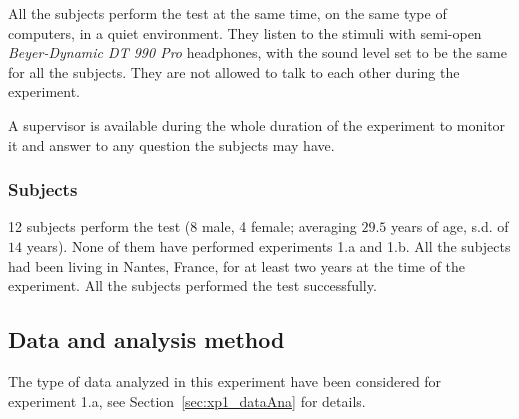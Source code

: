 \documentclass[12pt]{elsarticle}
\begin{document}

All the subjects perform the test at the same time, on the same type of computers, in a quiet environment. They listen to the stimuli with semi-open \emph{Beyer-Dynamic DT 990 Pro} headphones, with the sound level set to be the same for all the subjects. They are not allowed to talk to each other during the experiment.


A supervisor is available during the whole duration of the experiment to monitor it and answer to any question the subjects may have.

\subsubsection*{Subjects}


12 subjects perform the test (8 male, 4 female; averaging $29.5$ years of age, s.d. of $14$ years). None of them have performed experiments 1.a and 1.b. All the subjects had been living in Nantes, France, for at least two years at the time of the experiment. All the subjects performed the test successfully.

\subsection{Data and analysis method}


The type of data analyzed in this experiment have been considered for experiment 1.a, see Section~\ref{sec:xp1_dataAna} for details.
\end{document}

